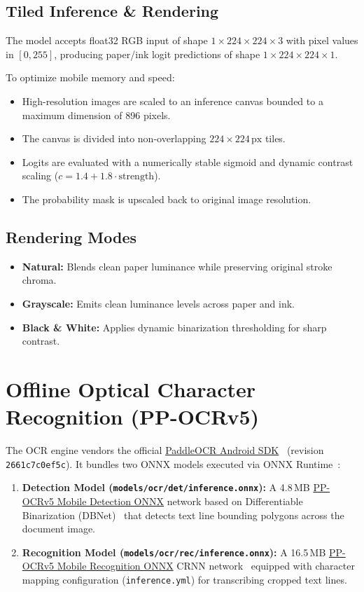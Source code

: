 \documentclass[11pt,a4paper]{article}
\begin{document}
\subsection{Tiled Inference \& Rendering}
The model accepts float32 RGB input of shape $1 \times 224 \times 224 \times 3$ with pixel values in $[0, 255]$, producing paper/ink logit predictions of shape $1 \times 224 \times 224 \times 1$.

To optimize mobile memory and speed:
\begin{itemize}[leftmargin=*]
  \item High-resolution images are scaled to an inference canvas bounded to a maximum dimension of 896 pixels.
  \item The canvas is divided into non-overlapping $224 \times 224\,\text{px}$ tiles.
  \item Logits are evaluated with a numerically stable sigmoid and dynamic contrast scaling ($c = 1.4 + 1.8 \cdot \text{strength}$).
  \item The probability mask is upscaled back to original image resolution.
\end{itemize}

\subsection{Rendering Modes}
\begin{itemize}[leftmargin=*]
  \item \textbf{Natural:} Blends clean paper luminance while preserving original stroke chroma.
  \item \textbf{Grayscale:} Emits clean luminance levels across paper and ink.
  \item \textbf{Black \& White:} Applies dynamic binarization thresholding for sharp contrast.
\end{itemize}

\section{Offline Optical Character Recognition (PP-OCRv5)}

The OCR engine vendors the official \href{https://github.com/PaddlePaddle/PaddleOCR}{PaddleOCR Android SDK}~\cite{du2020ppocr} (revision \texttt{2661c7c0ef5c}). It bundles two ONNX models executed via ONNX Runtime~\cite{onnxruntime2021}:

\begin{enumerate}[leftmargin=*]
  \item \textbf{Detection Model (\texttt{models/ocr/det/inference.onnx}):} A 4.8\,MB \href{https://github.com/PaddlePaddle/PaddleOCR}{PP-OCRv5 Mobile Detection ONNX} network based on Differentiable Binarization (DBNet)~\cite{liao2020real} that detects text line bounding polygons across the document image.
  \item \textbf{Recognition Model (\texttt{models/ocr/rec/inference.onnx}):} A 16.5\,MB \href{https://github.com/PaddlePaddle/PaddleOCR}{PP-OCRv5 Mobile Recognition ONNX} CRNN network~\cite{shi2016crnn} equipped with character mapping configuration (\texttt{inference.yml}) for transcribing cropped text lines.
\end{enumerate}
\end{document}
